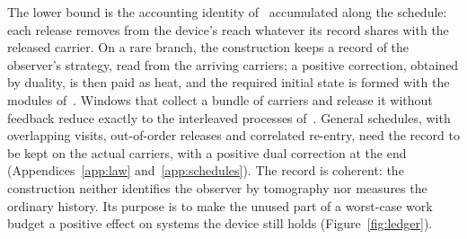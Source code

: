 \documentclass[11pt]{article}
\theoremstyle{definition}
\theoremstyle{remark}
\begin{document}
The lower bound is the accounting identity of~\cite{SaveWork} accumulated along the schedule: each release removes from the device's reach whatever its record shares with the released carrier. On a rare branch, the construction keeps a record of the observer's strategy, read from the arriving carriers; a positive correction, obtained by duality, is then paid as heat, and the required initial state is formed with the modules of~\cite[App.~E]{Answering}. Windows that collect a bundle of carriers and release it without feedback reduce exactly to the interleaved processes of~\cite{Answering}. General schedules, with overlapping visits, out-of-order releases and correlated re-entry, need the record to be kept on the actual carriers, with a positive dual correction at the end (Appendices~\ref{app:law} and~\ref{app:schedules}). The record is coherent: the construction neither identifies the observer by tomography nor measures the ordinary history. Its purpose is to make the unused part of a worst-case work budget a positive effect on systems the device still holds (Figure~\ref{fig:ledger}).
\end{document}
